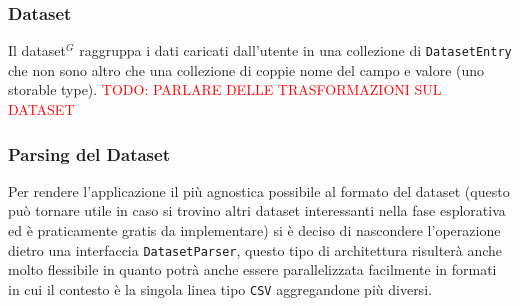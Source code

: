 \subsubsection{Dataset}
Il dataset$^{G}$ raggruppa i dati caricati dall'utente in una collezione di
\texttt{DatasetEntry} che non sono altro che una collezione di coppie nome del
campo e valore (uno storable type).
\textcolor{red}{TODO: PARLARE DELLE TRASFORMAZIONI SUL DATASET}


\subsubsection{Parsing del Dataset}

Per rendere l'applicazione il più agnostica possibile al formato del dataset 
(questo può tornare utile in caso si trovino altri dataset interessanti nella
fase esplorativa ed è praticamente gratis da implementare) si è deciso di
nascondere l'operazione dietro una interfaccia \texttt{DatasetParser}, questo
tipo di architettura risulterà anche molto flessibile in quanto potrà anche
essere parallelizzata facilmente in formati in cui il contesto è la singola
linea tipo \texttt{CSV} aggregandone più diversi.





